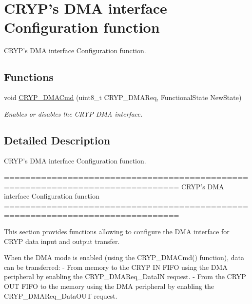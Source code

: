 \hypertarget{group___c_r_y_p___group4}{\section{C\-R\-Y\-P's D\-M\-A interface Configuration function}
\label{group___c_r_y_p___group4}
}


C\-R\-Y\-P's D\-M\-A interface Configuration function.  


\subsection*{Functions}
\begin{DoxyCompactItemize}
\item 
void \hyperlink{group___c_r_y_p___group4_ga111d0ec56facb27f8367ce6a33869115}{C\-R\-Y\-P\-\_\-\-D\-M\-A\-Cmd} (uint8\-\_\-t C\-R\-Y\-P\-\_\-\-D\-M\-A\-Req, Functional\-State New\-State)
\begin{DoxyCompactList}\small\item\em Enables or disables the C\-R\-Y\-P D\-M\-A interface. \end{DoxyCompactList}\end{DoxyCompactItemize}


\subsection{Detailed Description}
C\-R\-Y\-P's D\-M\-A interface Configuration function. \begin{DoxyVerb} ===============================================================================
                   CRYP's DMA interface Configuration function
 ===============================================================================  

  This section provides functions allowing to configure the DMA interface for 
  CRYP data input and output transfer.
   
  When the DMA mode is enabled (using the CRYP_DMACmd() function), data can be 
  transferred:
  - From memory to the CRYP IN FIFO using the DMA peripheral by enabling 
    the CRYP_DMAReq_DataIN request.
  - From the CRYP OUT FIFO to the memory using the DMA peripheral by enabling 
    the CRYP_DMAReq_DataOUT request.\end{DoxyVerb}
 

